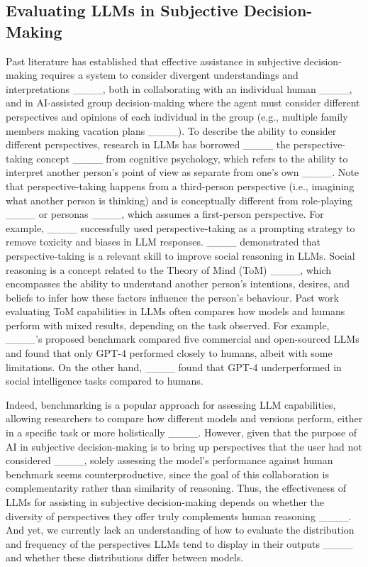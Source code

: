\subsection{Evaluating LLMs in Subjective Decision-Making}

Past literature has established that effective assistance in subjective decision-making requires a system to consider divergent understandings and interpretations ____, both in collaborating with an individual human ____, and in AI-assisted group decision-making where the agent must consider different perspectives and opinions of each individual in the group (e.g., multiple family members making vacation plans ____). To describe the ability to consider different perspectives, research in LLMs has borrowed ____ the perspective-taking concept ____ from cognitive psychology, which refers to the ability to interpret another person's point of view as separate from one's own ____. Note that perspective-taking happens from a third-person perspective (i.e., imagining what another person is thinking) and is conceptually different from role-playing ____ or personas ____, which assumes a first-person perspective. 
For example, ____ successfully used perspective-taking as a prompting strategy to remove toxicity and biases in LLM responses. ____ demonstrated that perspective-taking is a relevant skill to improve social reasoning in LLMs. Social reasoning is a concept related to the Theory of Mind (ToM) ____, which encompasses the ability to understand another person's intentions, desires, and beliefs to infer how these factors influence the person's behaviour. Past work evaluating ToM capabilities in LLMs often compares how models and humans perform with mixed results, depending on the task observed. For example, ____'s proposed benchmark compared five commercial and open-sourced LLMs and found that only GPT-4 performed closely to humans, albeit with some limitations. On the other hand, ____ found that GPT-4 underperformed in social intelligence tasks compared to humans.

Indeed, benchmarking is a popular approach for assessing LLM capabilities, allowing researchers to compare how different models and versions perform, either in a specific task or more holistically ____. However, given that the purpose of AI in subjective decision-making is to bring up perspectives that the user had not considered ____, solely assessing the model's performance against human benchmark seems counterproductive, since the goal of this collaboration is complementarity rather than similarity of reasoning. Thus, the effectiveness of LLMs for assisting in subjective decision-making depends on whether the diversity of perspectives they offer truly complements human reasoning ____.
And yet, we currently lack an understanding of how to evaluate the distribution and frequency of the perspectives LLMs tend to display in their outputs ____ and whether these distributions differ between models.